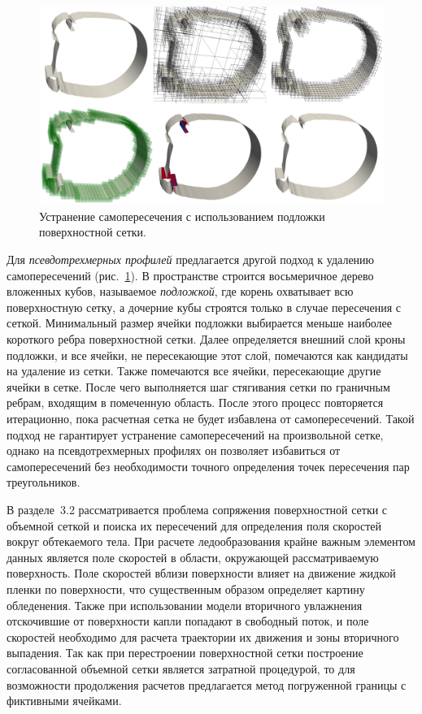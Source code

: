 \documentclass[a4paper,14pt]{extarticle}                     %
\theoremstyle{plain}                                         %
\begin{document}
\begin{figure}[!ht]
\centering
\includegraphics[width=1.0\textwidth]{fig/int_wing_all.png}
\singlespacing
\caption{Устранение самопересечения с использованием подложки поверхностной сетки.}
\label{fig:text_1_int_2}
\end{figure}

Для \textit{псевдотрехмерных профилей} предлагается другой подход к удалению самопересечений (рис.~\ref{fig:text_1_int_2}).
В пространстве строится восьмеричное дерево вложенных кубов, называемое \textit{подложкой}, где корень охватывает всю поверхностную сетку, а дочерние кубы строятся только в случае пересечения с сеткой.
Минимальный размер ячейки подложки выбирается меньше наиболее короткого ребра поверхностной сетки.
Далее определяется внешний слой кроны подложки, и все ячейки, не пересекающие этот слой, помечаются как кандидаты на удаление из сетки.
Также помечаются все ячейки, пересекающие другие ячейки в сетке.
После чего выполняется шаг стягивания сетки по граничным ребрам, входящим в помеченную область.
После этого процесс повторяется итерационно, пока расчетная сетка не будет избавлена от самопересечений.
Такой подход не гарантирует устранение самопересечений на произвольной сетке, однако на псевдотрехмерных профилях он позволяет избавиться от самопересечений без необходимости точного определения точек пересечения пар треугольников.


В разделе~3.2 рассматривается проблема сопряжения поверхностной сетки с объемной сеткой и поиска их пересечений для определения поля скоростей вокруг обтекаемого тела.
При расчете ледообразования крайне важным элементом данных является поле скоростей в области, окружающей рассматриваемую поверхность.
Поле скоростей вблизи поверхности влияет на движение жидкой пленки по поверхности, что существенным образом определяет картину обледенения.
Также при использовании модели вторичного увлажнения отскочившие от поверхности капли попадают в свободный поток, и поле скоростей необходимо для расчета траектории их движения и зоны вторичного выпадения.
Так как при перестроении поверхностной сетки построение согласованной объемной сетки является затратной процедурой, то для возможности продолжения расчетов предлагается метод погруженной границы с фиктивными ячейками.
\end{document}
